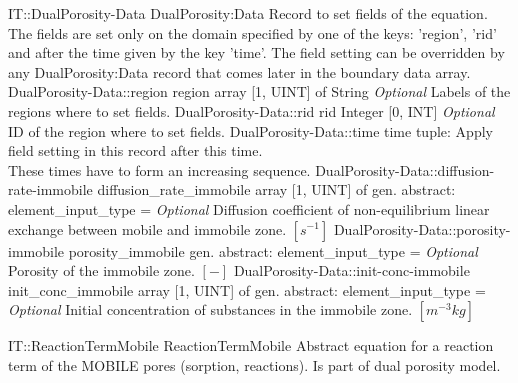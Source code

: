 \begin{RecordType}
	{IT::DualPorosity-Data}
	{DualPorosity:Data}
	{}%
	{}%
	{{{Record to set fields of the equation.}\\{
The fields are set only on the domain specified by one of the keys: 'region', 'rid'}\\{
and after the time given by the key 'time'. The field setting can be overridden by}\\{
 any DualPorosity:Data record that comes later in the boundary data array.}%
}}
		\RecKey
			{DualPorosity-Data::region}
			{region}
			{{array [1, UINT] of }{String}}{}
			{ \it{Optional}}
			{{{Labels of the regions where to set fields. }%
}}
		\RecKey
			{DualPorosity-Data::rid}
			{rid}
			{{Integer [0, INT]}}{}
			{ \it{Optional}}
			{{{ID of the region where to set fields.}%
}}
		\RecKey
			{DualPorosity-Data::time}
			{time}
			{{tuple: }}{}
			{ }
			{{{Apply field setting in this record after this time.}\\{
These times have to form an increasing sequence.}%
}}
		\RecKey
			{DualPorosity-Data::diffusion-rate-immobile}
			{diffusion{\_}rate{\_}immobile}
			{{array [1, UINT] of }{gen. abstract: }}{{element{\_}input{\_}type}{ = }}
			{ \it{Optional}}
			{{{Diffusion coefficient of non-equilibrium linear exchange between mobile and immobile zone. }{$[s^{-1}]$}%
}}
		\RecKey
			{DualPorosity-Data::porosity-immobile}
			{porosity{\_}immobile}
			{{gen. abstract: }}{{element{\_}input{\_}type}{ = }}
			{ \it{Optional}}
			{{{Porosity of the immobile zone. }{$[-]$}%
}}
		\RecKey
			{DualPorosity-Data::init-conc-immobile}
			{init{\_}conc{\_}immobile}
			{{array [1, UINT] of }{gen. abstract: }}{{element{\_}input{\_}type}{ = }}
			{ \it{Optional}}
			{{{Initial concentration of substances in the immobile zone. }{$[m^{-3}kg]$}%
}}
\end{RecordType}
\begin{AbstractType}
	{IT::ReactionTermMobile}
	{ReactionTermMobile}
	{}
	{{{Abstract equation for a reaction term of the MOBILE pores (sorption, reactions). Is part of dual porosity model.}%
}}
\end{AbstractType}
